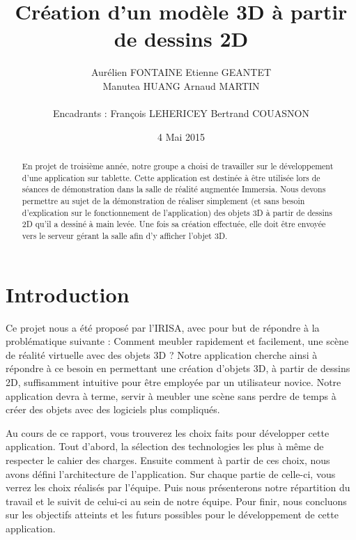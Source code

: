 \documentclass[a4paper,11pt]{article}
\title{ \textbf{Création d'un modèle 3D à partir de dessins 2D} }
\author{ Aurélien \textsc{FONTAINE} Etienne \textsc{GEANTET} \\
	Manutea \textsc{HUANG} Arnaud \textsc{MARTIN} \\
	\\
	Encadrants : François \textsc{LEHERICEY}	Bertrand \textsc{COUASNON}}
\date{4 Mai 2015}                    %
\begin{document}
\maketitle                 %
\thispagestyle{empty}      %

\begin{abstract}
	En projet de troisième année, notre groupe a choisi de travailler sur le développement d'une application sur tablette. Cette application est destinée à être utilisée lors de séances de démonstration dans la salle de réalité augmentée Immersia. Nous devons permettre au sujet de la démonstration de réaliser simplement (et sans besoin d'explication sur le fonctionnement de l'application) des objets 3D à partir de dessins 2D qu'il a dessiné à main levée. Une fois sa création effectuée, elle doit être envoyée vers le serveur gérant la salle afin d'y afficher l'objet 3D.
\end{abstract}
	
	\section{Introduction} %
		Ce projet nous a été proposé par l'IRISA, avec pour but de répondre à la problématique suivante : Comment meubler rapidement et facilement, une scène de réalité virtuelle avec des objets 3D ? Notre application cherche ainsi à répondre à ce besoin en permettant une création d'objets 3D, à partir de dessins 2D, suffisamment intuitive pour être employée par un utilisateur novice. Notre application devra à terme, servir à meubler une scène sans perdre de temps à créer des objets avec des logiciels plus compliqués.
		
		Au cours de ce rapport, vous trouverez les choix faits pour développer cette application. Tout d'abord, la sélection des technologies les plus à même de respecter le cahier des charges. Ensuite comment à partir de ces choix, nous avons défini l'architecture de l'application. Sur chaque partie de celle-ci, vous verrez les choix réalisés par l'équipe. Puis nous présenterons notre répartition du travail et le suivit de celui-ci au sein de notre équipe. Pour finir, nous concluons sur les objectifs atteints et les futurs possibles pour le développement de cette application.
\end{document}

